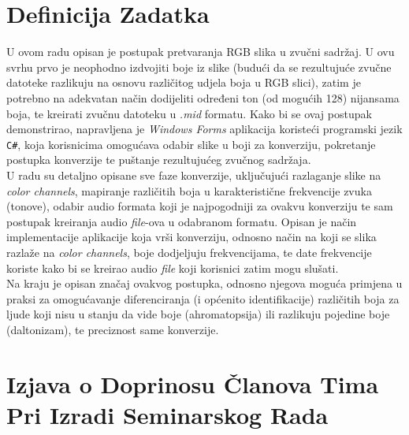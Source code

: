 \documentclass[12pt,a4paper]{article}
\begin{document}


\section*{Definicija Zadatka}

U ovom radu opisan je postupak pretvaranja RGB slika u zvučni sadržaj. U ovu svrhu prvo je neophodno izdvojiti boje iz slike (budući da se rezultujuće zvučne datoteke razlikuju na osnovu različitog udjela boja u RGB slici), zatim je potrebno na adekvatan način dodijeliti određeni ton (od mogućih 128) nijansama boja, te kreirati zvučnu datoteku u \textit{.mid} formatu. Kako bi se ovaj postupak demonstrirao, napravljena je \textit{Windows Forms} aplikacija koristeći programski jezik \texttt{C\#}, koja korisnicima omogućava odabir slike u boji za konverziju, pokretanje postupka konverzije te puštanje rezultujućeg zvučnog sadržaja. \\

U radu su detaljno opisane sve faze konverzije, uključujući razlaganje slike na \textit{color channels}, mapiranje različitih boja u karakteristične frekvencije zvuka (tonove), odabir audio formata koji je najpogodniji za ovakvu konverziju te sam postupak kreiranja audio \textit{file}-ova u odabranom formatu. Opisan je način implementacije aplikacije koja vrši konverziju, odnosno način na koji se slika razlaže na \textit{color channels}, boje dodjeljuju frekvencijama, te date frekvencije koriste kako bi se kreirao audio \textit{file} koji korisnici zatim mogu slušati. \\

Na kraju je opisan značaj ovakvog postupka, odnosno njegova moguća primjena u praksi za omogućavanje diferenciranja (i općenito identifikacije) različitih boja za ljude koji nisu u stanju da vide boje (ahromatopsija) ili razlikuju pojedine boje (daltonizam), te preciznost same konverzije.

\newpage

\section*{Izjava o Doprinosu Članova Tima Pri Izradi Seminarskog Rada}
\end{document}
